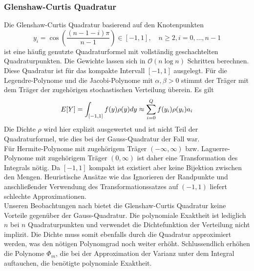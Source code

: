 \subsubsection*{Glenshaw-Curtis Quadratur}
Die Glenshaw-Curtis Quadratur basierend auf den Knotenpunkten 
\[y_i=\cos\left(\frac{(n-1-i)\pi}{n-1}\right)\in[-1,1],\quad n\ge 2, i=0,\dots,n-1\]
ist eine häufig genutzte Quadraturformel mit vollständig geschachtelten Quadraturpunkten. Die Gewichte lassen sich in $\mathcal{O}(n\log n)$ Schritten berechnen.\\
Diese Quadratur ist für das kompakte Intervall $[-1,1]$ ausgelegt. Für die Legendre-Polynome und die Jacobi-Polynome mit $\alpha,\beta>0$ stimmt der Träger mit dem Träger der zugehörigen stochastischen Verteilung überein. Es gilt
\[\\E[Y]=\int_{[-1,1]}f(y)\rho(y)dy\approx\sum_{i=0}^Qf(y_i)\rho(y_i)a_i\]
Die Dichte $\rho$ wird hier explizit ausgewertet und ist nicht Teil der Quadraturformel, wie dies bei der Gauss-Quadratur der Fall war.\\
Für Hermite-Polynome mit zugehörigem Träger $(-\infty,\infty)$ bzw. Laguerre-Polynome mit zugehörigem Träger $(0,\infty)$ ist daher eine Transformation des Integrals nötig. Da $[-1,1]$ kompakt ist existiert aber keine Bijektion zwischen den Mengen. Heuristische Ansätze wie das Ignorieren der Randpunkte und anschließender Verwendung des Transformationssatzes auf $(-1,1)$ liefert schlechte Approximationen.\\
Unseren Beobachtungen nach bietet die Glenshaw-Curtis Quadratur keine Vorteile gegenüber der Gauss-Quadratur. Die polynomiale Exaktheit ist lediglich $n$ bei $n$ Quadraturpunkten und verwendet die Dichtefunktion der Verteilung nicht implizit. Die Dichte muss somit ebenfalls durch die Quadratur approximiert werden, was den nötigen Polynomgrad noch weiter erhöht. Schlussendlich erhöhen die Polynome $\Phi_m$, die bei der Approximation der Varianz unter dem Integral auftauchen, die benötigte polynomiale Exaktheit.
